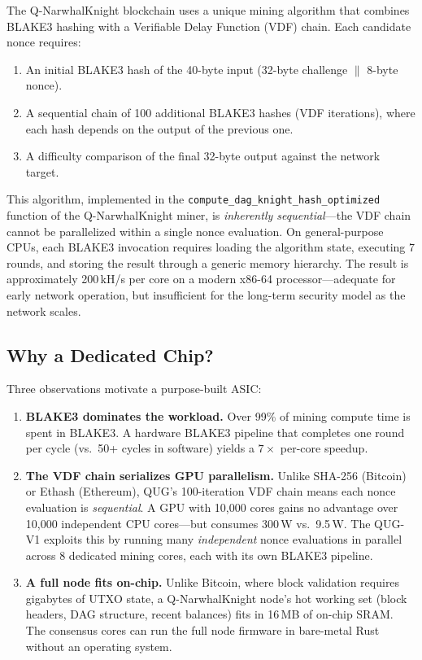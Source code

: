 \documentclass[11pt,a4paper]{article}
\begin{document}
The Q-NarwhalKnight blockchain uses a unique mining algorithm that combines BLAKE3 hashing with a Verifiable Delay Function (VDF) chain. Each candidate nonce requires:

\begin{enumerate}[label=\textbf{\arabic*.}]
    \item An initial BLAKE3 hash of the 40-byte input (32-byte challenge $\|$ 8-byte nonce).
    \item A sequential chain of 100 additional BLAKE3 hashes (VDF iterations), where each hash depends on the output of the previous one.
    \item A difficulty comparison of the final 32-byte output against the network target.
\end{enumerate}

This algorithm, implemented in the \texttt{compute\_dag\_knight\_hash\_optimized} function of the Q-NarwhalKnight miner, is \emph{inherently sequential}---the VDF chain cannot be parallelized within a single nonce evaluation. On general-purpose CPUs, each BLAKE3 invocation requires loading the algorithm state, executing 7 rounds, and storing the result through a generic memory hierarchy. The result is approximately 200\,kH/s per core on a modern x86-64 processor---adequate for early network operation, but insufficient for the long-term security model as the network scales.

\subsection{Why a Dedicated Chip?}

Three observations motivate a purpose-built ASIC:

\begin{enumerate}
    \item \textbf{BLAKE3 dominates the workload.} Over 99\% of mining compute time is spent in BLAKE3. A hardware BLAKE3 pipeline that completes one round per cycle (vs.\ 50+ cycles in software) yields a $7\times$ per-core speedup.

    \item \textbf{The VDF chain serializes GPU parallelism.} Unlike SHA-256 (Bitcoin) or Ethash (Ethereum), QUG's 100-iteration VDF chain means each nonce evaluation is \emph{sequential}. A GPU with 10,000 cores gains no advantage over 10,000 independent CPU cores---but consumes 300\,W vs.\ 9.5\,W. The QUG-V1 exploits this by running many \emph{independent} nonce evaluations in parallel across 8 dedicated mining cores, each with its own BLAKE3 pipeline.

    \item \textbf{A full node fits on-chip.} Unlike Bitcoin, where block validation requires gigabytes of UTXO state, a Q-NarwhalKnight node's hot working set (block headers, DAG structure, recent balances) fits in 16\,MB of on-chip SRAM. The consensus cores can run the full node firmware in bare-metal Rust without an operating system.
\end{enumerate}
\end{document}
